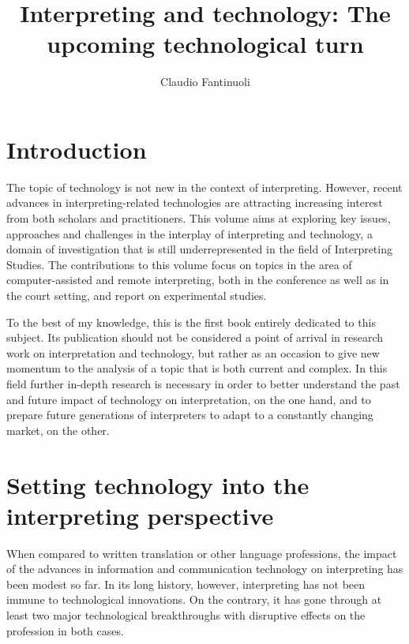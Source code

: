 \documentclass[output=paper]{langsci/langscibook}
\title{Interpreting and technology: The upcoming technological turn}
\author{Claudio Fantinuoli\affiliation{Mainz University}}
\begin{document}
\maketitle


 

 
\section{Introduction} 
 
The topic of technology is not new in the context of interpreting. However, recent advances in interpreting-related technologies are attracting increasing interest from both scholars and practitioners. This volume aims at exploring key issues, approaches and challenges in the interplay of interpreting and technology, a domain of investigation that is still underrepresented in the field of Interpreting Studies. The contributions to this volume focus on topics in the area of computer-assisted and remote interpreting, both in the conference as well as in the court setting, and report on experimental studies.
 
To the best of my knowledge, this is the first book entirely dedicated to this subject. Its publication should not be considered a point of arrival in research work on interpretation and technology, but rather as an occasion to give new momentum to the analysis of a topic that is both current and complex. In this field further in-depth research is necessary in order to better understand the past and future impact of technology on interpretation, on the one hand, and to prepare future generations of interpreters to adapt to a constantly changing market, on the other.
 
\section{Setting technology into the interpreting perspective} 
When compared to written translation or other language professions, the impact of the advances in information and communication technology on interpreting has been modest so far. In its long history, however, interpreting has not been immune to technological innovations. On the contrary, it has gone through at least two major technological breakthroughs with disruptive effects on the profession in both cases. 
 
\end{document}
